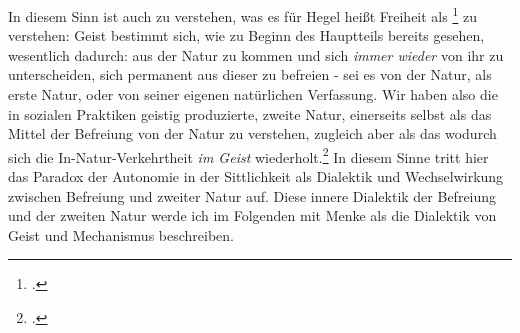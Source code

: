 \documentclass[12pt, a4paper, openany]{report}
\begin{document}
In diesem Sinn ist auch zu verstehen, was es für Hegel heißt Freiheit als \footcite[][§194, S. 197.]{hegel_grundlinien_2017} zu verstehen: 
Geist bestimmt sich, wie zu Beginn des Hauptteils bereits gesehen, wesentlich dadurch: 
aus der Natur zu kommen und sich \emph{immer wieder} von ihr zu unterscheiden, sich permanent aus dieser zu befreien - sei es von der Natur, als erste Natur, oder von seiner eigenen natürlichen Verfassung.
Wir haben also die in sozialen Praktiken geistig produzierte, zweite Natur, einerseits selbst als das Mittel der Befreiung von der Natur zu verstehen, zugleich aber als das wodurch sich die In-Natur-Verkehrtheit \emph{im Geist} wiederholt.\footcite[Vgl.][41]{menke_autonomie_2018}
In diesem Sinne tritt hier das Paradox der Autonomie in der Sittlichkeit als Dialektik und Wechselwirkung zwischen Befreiung und zweiter Natur auf.
Diese innere Dialektik der Befreiung und der zweiten Natur werde ich im Folgenden mit Menke als die Dialektik von Geist und Mechanismus beschreiben.
\end{document}

